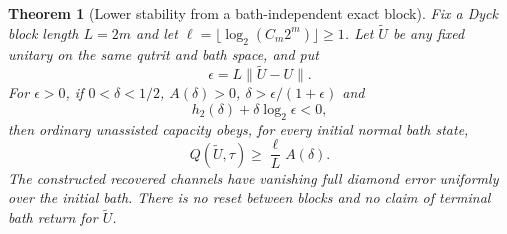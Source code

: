 \documentclass[11pt]{article}
\newtheorem{theorem}{Theorem}[section]
\newcommand{\norm}[1]{\lVert #1\rVert}
\begin{document}
\begin{theorem}[Lower stability from a bath-independent exact block]\label{thm:lowerstable}
Fix a Dyck block length $L=2m$ and let $\ell=\lfloor\log_2(C_m2^m)\rfloor\ge1$. Let $\widetilde U$ be any fixed unitary on the same qutrit and bath space, and put
\[
 \epsilon=L\norm{\widetilde U-U}.
\]
For $\epsilon>0$, if $0<\delta<1/2$, $A(\delta)>0$,
$\delta>\epsilon/(1+\epsilon)$ and
\begin{equation}
 h_2(\delta)+\delta\log_2\epsilon<0,\label{eq:lowercondition}
\end{equation}
then ordinary unassisted capacity obeys, for every initial normal bath state,
\begin{equation}
 Q(\widetilde U,\tau)\ge\frac\ell L A(\delta).\label{eq:lowerbound}
\end{equation}
The constructed recovered channels have vanishing full diamond error uniformly over the initial bath. There is no reset between blocks and no claim of terminal bath return for $\widetilde U$.
\end{theorem}
\end{document}
